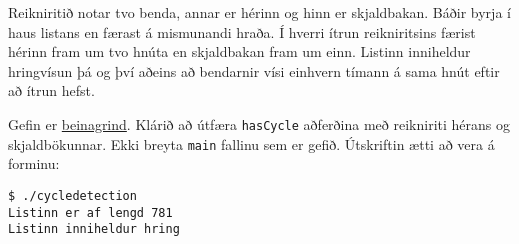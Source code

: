 \documentclass{article}
\begin{document}
Reikniritið notar tvo benda, annar er hérinn og hinn er skjaldbakan. Báðir byrja í haus listans en færast á mismunandi hraða. Í hverri ítrun reikniritsins færist hérinn fram um tvo hnúta en skjaldbakan fram um einn. Listinn inniheldur hringvísun þá og því aðeins að bendarnir vísi einhvern tímann á sama hnút eftir að ítrun hefst. 

Gefin er \href{https://raw.githubusercontent.com/Ernir/kennsluefni/master/T2/Code/w4/cycledetection.cpp}{beinagrind}. Klárið að útfæra \texttt{hasCycle} aðferðina með reikniriti hérans og skjaldbökunnar. Ekki breyta \texttt{main} fallinu sem er gefið. Útskriftin ætti að vera á forminu:

\begin{verbatim}
$ ./cycledetection
Listinn er af lengd 781
Listinn inniheldur hring
\end{verbatim}

\vfill
\end{document}
